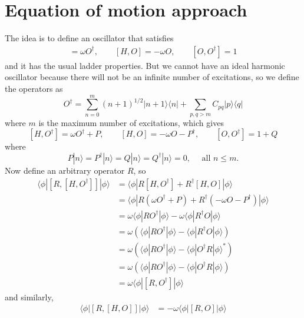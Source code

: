 \section{Equation of motion approach}
The idea is to define an oscillator that satisfies
\begin{align}
    [H, O^\dag] = \omega O^\dag , \quad  \quad [H, O] = -\omega O , \quad \quad [O, O^\dag] = 1
\end{align}
and it has the usual ladder properties. But we cannot have an ideal harmonic oscillator because there will not be an infinite number of excitations, so we define the operators as
\begin{equation}
O^{\dagger}=\sum_{n=0}^m(n+1)^{1 / 2}|n+1\rangle\langle n|+\sum_{p, q>m} C_{p q}|p\rangle\langle q|
\end{equation}
where $m$ is the maximum number of excitations,
which gives 
\begin{equation}
{\left[H, O^{\dagger}\right] } =\omega O^{\dagger}+P, \quad \quad
{[H, O] } =-\omega O-P^{\dagger}, \quad \quad [O, O^{\dagger}] = 1+Q
\end{equation}
where
$$
P|n\rangle=P^\dag|n\rangle=Q|n\rangle=Q^{\dagger}|n\rangle=0, \quad \text { all } n \leq m .
$$
Now define an arbitrary operator $R$, so
\begin{align}
    \langle \phi | [R,[H, O^\dagger]] | \phi \rangle 
    &= \langle \phi | R[H, O^\dagger] + R^\dagger[H, O] | \phi \rangle \\
    &= \langle \phi | R(\omega O^\dagger + P) + R^\dagger(-\omega O - P^\dagger) | \phi \rangle \\
    &= \omega \langle \phi | R O^\dagger | \phi \rangle - \omega \langle \phi | R^\dagger O | \phi \rangle \\
    &= \omega \left( \langle \phi | R O^\dagger | \phi \rangle - \langle \phi | R^\dagger O | \phi \rangle \right) \\
    &= \omega \left( \langle \phi | R O^\dagger | \phi \rangle - \langle \phi | O^\dagger R | \phi \rangle^* \right) \\
    &= \omega \left( \langle \phi | R O^\dagger | \phi \rangle - \langle \phi | O^\dagger R | \phi \rangle
 \right) \\
    &= \omega \langle \phi | [R, O^\dagger] | \phi \rangle
\end{align}
and similarly,
\begin{align}
    \langle \phi | [R,[H, O]] | \phi \rangle 
    &= -\omega \langle \phi | [R, O] | \phi \rangle
\end{align}
